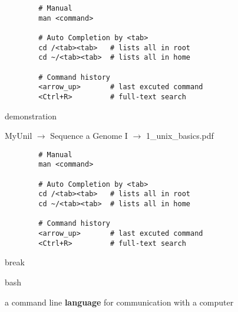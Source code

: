 \documentclass[xcolor=dvipsnames]{beamer}
\begin{document}
\begin{frame}[fragile]
	\Large
	\begin{verbatim}
		# Manual
		man <command>

		# Auto Completion by <tab>
		cd /<tab><tab>   # lists all in root
		cd ~/<tab><tab>  # lists all in home

		# Command history
		<arrow_up>       # last excuted command
		<Ctrl+R>         # full-text search
	\end{verbatim}
\end{frame}

\begin{frame}
	\Huge
	\begin{center}
		demonstration
	\end{center}
\end{frame}

\begin{frame}[fragile]
	\begin{center}
		MyUnil $\rightarrow$ Sequence a Genome I $\rightarrow$ 1\_unix\_basics.pdf
	\end{center}
	\Large
	\begin{verbatim}
		# Manual
		man <command>

		# Auto Completion by <tab>
		cd /<tab><tab>   # lists all in root
		cd ~/<tab><tab>  # lists all in home

		# Command history
		<arrow_up>       # last excuted command
		<Ctrl+R>         # full-text search
	\end{verbatim}
\end{frame}

\begin{frame}
	\Huge
	\begin{center}
		break
	\end{center}
\end{frame}

\begin{frame}
	\Huge
	\begin{center}
		bash
	\end{center}
	\large
	a command line \huge \textbf{language} \large for communication with a computer
\end{frame}
\end{document}
